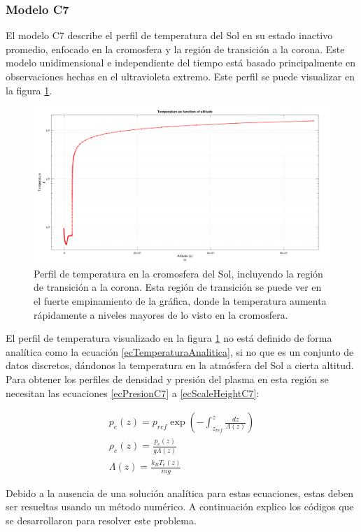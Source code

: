 \subsubsection{Modelo C7} \label{sec:c7Modelo}
El modelo C7 describe el perfil de temperatura del Sol en su estado inactivo
promedio, enfocado en la cromosfera y la región de transición a la corona.
\cite{c7ModelPaper} Este modelo unidimensional e independiente del tiempo está
basado principalmente en observaciones hechas en el ultravioleta extremo. Este
perfil se puede visualizar en la figura \ref{c7TemperaturaGrafica}.

\begin{figure}[!ht]
	\centering
	\includegraphics[scale=0.3]{Figuras/C7ModeloTemperaturaGrafica.png}
	\caption{Perfil de temperatura en la cromosfera del Sol, incluyendo la región de transición a la corona. Esta región de transición se puede ver en el fuerte empinamiento de la gráfica, donde la temperatura aumenta rápidamente a niveles mayores de lo visto en la cromosfera.}
	\label{c7TemperaturaGrafica}
\end{figure}

El perfil de temperatura visualizado en la figura \ref{c7TemperaturaGrafica} no
está definido de forma analítica como la ecuación \ref{ecTemperaturaAnalitica},
si no que es un conjunto de datos discretos, dándonos la temperatura en la
atmósfera del Sol a cierta altitud. Para obtener los perfiles de densidad y
presión del plasma en esta región se necesitan las ecuaciones \ref{ecPresionC7}
a \ref{ecScaleHeightC7}:

\begin{equ}[!ht]
	\begin{align}
		p_e (z) = p_{ref} \exp \left(- \int_{z_{ref}}^{z} \frac{dz}{\Lambda (z)}\right) \label{ecPresionC7} \\
		\rho_e (z) = \frac{p_e (z)}{g \Lambda (z)} \label{ecDensidadC7} \\
		\Lambda (z) = \frac{k_B T_e (z)}{m g} \label{ecScaleHeightC7}
	\end{align}
	\caption*{Ecuaciones del equilibrio hidrostático para el modelo C7 de
	temperatura. \cite{newtonianCafe} \(\Lambda (z)\) es la altura de escala, la
	cual modela el decrecimiento de la temperatura del plasma con respecto a la
	altitud.} 
\end{equ}

Debido a la ausencia de una solución analítica para estas ecuaciones, estas
deben ser resueltas usando un método numérico. A continuación explico los
códigos que se desarrollaron para resolver este problema.